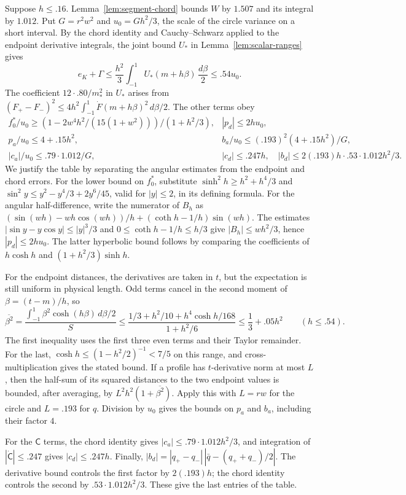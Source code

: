 Suppose $h\le.16$. Lemma~\ref{lem:segment-chord} bounds $W$ by
$1.507$ and its integral by $1.012$. Put $G=r^2w^2$ and
$u_0=Gh^2/3$, the scale of the circle variance on a short interval.
By the chord identity and Cauchy--Schwarz applied to the
endpoint derivative integrals, the joint bound $U_*$ in
Lemma~\ref{lem:scalar-ranges} gives
\[
 e_K+\Gamma
 \le\frac{h^2}{3}\int_{-1}^1
 U_*(m+h\beta)\,\frac{d\beta}{2}
 \le .54u_0.
\]
The coefficient $12\cdot .80/m_*^2$ in $U_*$ arises from
$(F_+-F_-)^2\le4h^2\int_{-1}^1\dot F(m+h\beta)^2\,d\beta/2$.
The other terms obey
\[
\begin{array}{ll}
 f_0^*/u_0\ge (1-2w^4 h^2/(15(1+w^2)))/(1+h^2/3),
 & |p_d|\le 2h u_0,\\
 p_a/u_0\le4+.15 h^2,
 & b_a/u_0\le(.193)^2(4+.15h^2)/G,\\
 |c_a|/u_0\le.79\cdot1.012/G,& |c_d|\le.247 h,\quad
 |b_d|\le2(.193)h\cdot .53\cdot1.012h^2/3 .
\end{array}
\]
We justify the table by separating the angular estimates from the
endpoint and chord errors. For the lower bound on $f_0^*$, substitute
$\sinh^2h\ge h^2+h^4/3$ and
$\sin^2 y\le y^2-y^4/3+2y^6/45$, valid for $|y|\le2$, in its
defining formula. For the angular half-difference, write the numerator
of $B_h$ as
$(\sin(wh)-wh\cos(wh))/h+(\coth h-1/h)\sin(wh)$.
The estimates $|\sin y-y\cos y|\le|y|^3/3$ and
$0\le\coth h-1/h\le h/3$ give $|B_h|\le wh^2/3$, hence
$|p_d|\le2hu_0$. The latter hyperbolic bound follows by comparing
the coefficients of $h\cosh h$ and $(1+h^2/3)\sinh h$.

For the endpoint distances, the derivatives are taken in $t$, but the
expectation is still uniform in physical length. Odd terms cancel in
the second moment of $\beta=(t-m)/h$, so
\[
 \overline{\beta^2}
 =\frac{\int_{-1}^1\beta^2\cosh(h\beta)\,d\beta/2}{S}
 \le\frac{1/3+h^2/10+h^4\cosh h/168}{1+h^2/6}
 \le\frac13+.05h^2\qquad(h\le.54).
\]
The first inequality uses the first three even terms and their Taylor
remainder. For the last, $\cosh h\le(1-h^2/2)^{-1}<7/5$ on this
range, and cross-multiplication gives the stated bound.
If a profile has $t$-derivative norm at most $L$, then the half-sum of
its squared distances to the two endpoint values is bounded, after
averaging, by $L^2h^2(1+\overline{\beta^2})$.
Apply this with $L=rw$ for the circle and $L=.193$ for $q$.
Division by $u_0$ gives the bounds on $p_a$ and $b_a$, including their
factor $4$.

For the $\mathsf C$ terms, the chord identity gives
$|c_a|\le.79\cdot1.012h^2/3$, and integration of
$|\dot{\mathsf C}|\le.247$ gives $|c_d|\le.247h$.
Finally,
$|b_d|=|q_+-q_-|\,|\bar q-(q_++q_-)/2|$.
The derivative bound controls the first factor by $2(.193)h$;
the chord identity controls the second by $.53\cdot1.012h^2/3$.
These give the last entries of the table.

